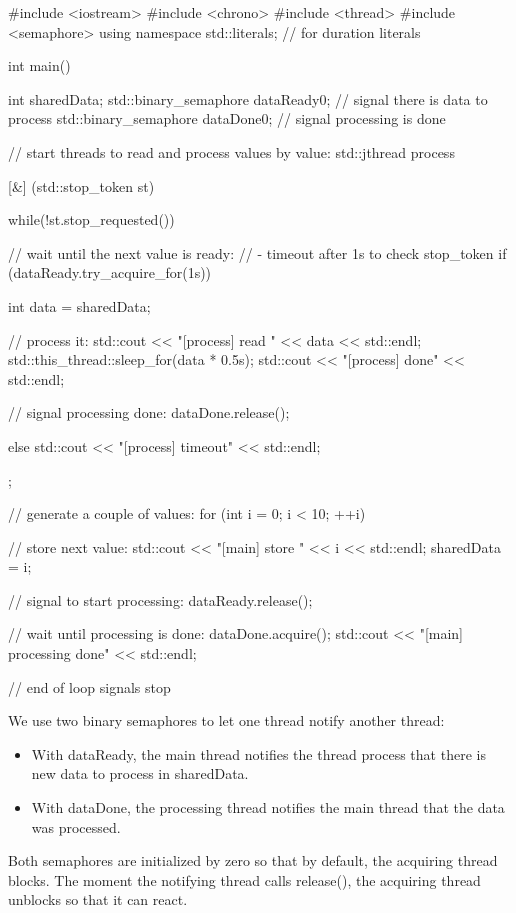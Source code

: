 \begin{cpp}
#include <iostream>
#include <chrono>
#include <thread>
#include <semaphore>
using namespace std::literals; // for duration literals

int main()
{
	int sharedData;
	std::binary_semaphore dataReady{0}; // signal there is data to process
	std::binary_semaphore dataDone{0}; // signal processing is done
	
	// start threads to read and process values by value:
	std::jthread process{[&] (std::stop_token st) {
						while(!st.stop_requested()) {
							// wait until the next value is ready:
							// - timeout after 1s to check stop_token
							if (dataReady.try_acquire_for(1s)) {
								int data = sharedData;
								
								// process it:
								std::cout << "[process] read " << data << std::endl;
								std::this_thread::sleep_for(data * 0.5s);
								std::cout << "[process] done" << std::endl;
								
								// signal processing done:
								dataDone.release();
							}
							else {
								std::cout << "[process] timeout" << std::endl;
							}
							}
						}};
		
	// generate a couple of values:
	for (int i = 0; i < 10; ++i) {
		// store next value:
		std::cout << "[main] store " << i << std::endl;
		sharedData = i;
		
		// signal to start processing:
		dataReady.release();
		
		// wait until processing is done:
		dataDone.acquire();
		std::cout << "[main] processing done\n" << std::endl;
	}
	// end of loop signals stop
}
\end{cpp}

We use two binary semaphores to let one thread notify another thread:

\begin{itemize}
\item 
With dataReady, the main thread notifies the thread process that there is new data to process in sharedData.

\item 
With dataDone, the processing thread notifies the main thread that the data was processed.
\end{itemize}

Both semaphores are initialized by zero so that by default, the acquiring thread blocks. The moment the notifying thread calls release(), the acquiring thread unblocks so that it can react.

